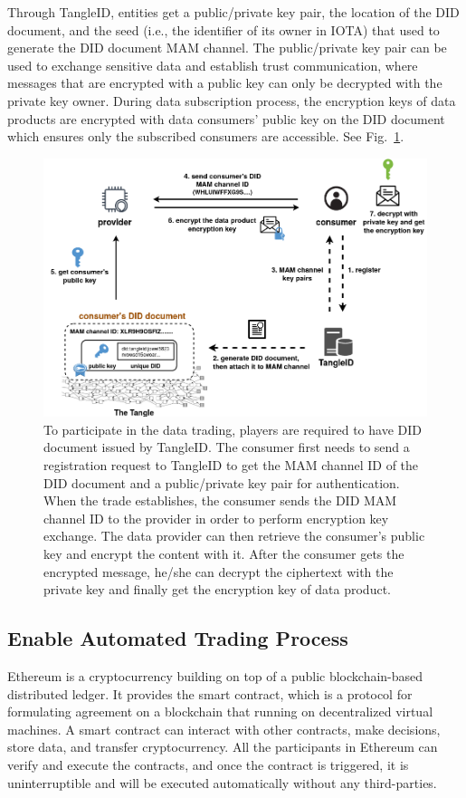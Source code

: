 \begin{spacing}{2.0}
Through TangleID, entities get a public/private key pair, the location of the DID document, and the seed (i.e., the identifier of its owner in IOTA) that used to generate the DID document MAM channel. The public/private key pair can be used to exchange sensitive data and establish trust communication, where messages that are encrypted with a public key can only be decrypted with the private key owner. During data subscription process, the encryption keys of data products are encrypted with data consumers' public key on the DID document which ensures only the subscribed consumers are accessible. See Fig.~\ref{fig:TangleID}.

\begin{figure}[h]
    \centering
    \includegraphics[width=5.5in]{img/TangleID}
    \caption{To participate in the data trading, players are required to have DID document issued by TangleID. The consumer first needs to send a registration request to TangleID to get the MAM channel ID of the DID document and a public/private key pair for authentication. When the trade establishes, the consumer sends the DID MAM channel ID to the provider in order to perform encryption key exchange. The data provider can then retrieve the consumer's public key and encrypt the content with it. After the consumer gets the encrypted message, he/she can decrypt the ciphertext with the private key and finally get the encryption key of data product.}
    \label{fig:TangleID}
\end{figure}
\clearpage

\subsection{Enable Automated Trading Process}
Ethereum is a cryptocurrency building on top of a public blockchain-based distributed ledger. It provides the smart contract, which is a protocol for formulating agreement on a blockchain that running on decentralized virtual machines. A smart contract can interact with other contracts, make decisions, store data, and transfer cryptocurrency. All the participants in Ethereum can verify and execute the contracts, and once the contract is triggered, it is uninterruptible and will be executed automatically without any third-parties.


\end{spacing}
